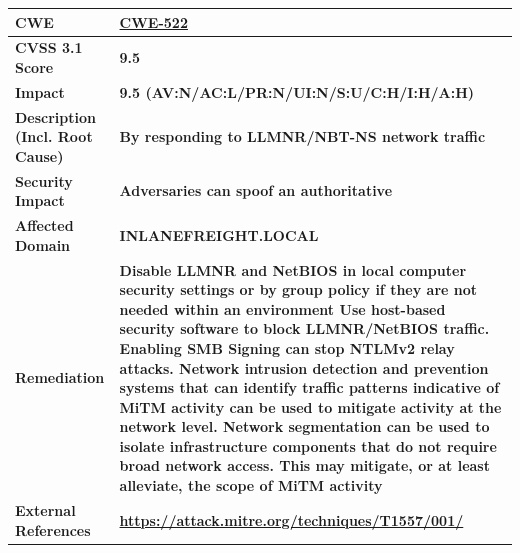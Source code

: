 {
\begin{table}[h!]
    \centering
    \begin{tabular}{|p{3cm}|p{15cm}|} 
        \hline
        \rowcolor{TableBgRowColor}        
        \cellcolor{HighVulnColor} \textbf{CWE} & 
        \textbf{\href{https://cwe.mitre.org/data/definitions/522.html}{CWE-522} } \\
        \hline
        \rowcolor{TableBgRowIntemediaColor}
        \cellcolor{HighVulnColor} \textbf{CVSS 3.1 Score} & 
        \textbf{9.5} \\
        \hline
        \rowcolor{TableBgRowColor}
        \cellcolor{HighVulnColor} \textbf{Impact} & 
        \textbf{9.5 (AV:N/AC:L/PR:N/UI:N/S:U/C:H/I:H/A:H)} \\
        \hline
        \rowcolor{TableBgRowIntemediaColor}        
        \cellcolor{HighVulnColor} \textbf{Description (Incl. Root
Cause)} & 
        \textbf{By responding to LLMNR/NBT-NS network traffic} \\
        \hline        
        \rowcolor{TableBgRowColor}        
        \cellcolor{HighVulnColor} \textbf{Security Impact} & 
        \textbf{Adversaries can spoof an authoritative } \\
        \hline
        \rowcolor{TableBgRowIntemediaColor}        
        \cellcolor{HighVulnColor} \textbf{Affected Domain} & 
        \textbf{INLANEFREIGHT.LOCAL} \\
        \hline
        \rowcolor{TableBgRowColor}        
        \cellcolor{HighVulnColor} \textbf{Remediation} & 
        \textbf{Disable LLMNR and NetBIOS in local computer security settings or by group policy if
they are not needed within an environment
 Use host-based security software to block LLMNR/NetBIOS traffic. Enabling SMB
Signing can stop NTLMv2 relay attacks.
 Network intrusion detection and prevention systems that can identify traffic patterns
indicative of MiTM activity can be used to mitigate activity at the network level.
 Network segmentation can be used to isolate infrastructure components that do not
require broad network access. This may mitigate, or at least alleviate, the scope of
MiTM activity} \\
        \hline
        \rowcolor{TableBgRowIntemediaColor}        
        \cellcolor{HighVulnColor} \textbf{External References} & 
        \textbf{\url{https://attack.mitre.org/techniques/T1557/001/}} \\
        \hline
    \end{tabular}
\end{table}



}
